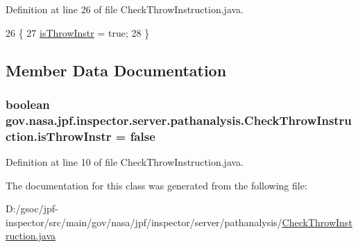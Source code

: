 Definition at line 26 of file Check\+Throw\+Instruction.\+java.


\begin{DoxyCode}
26                                 \{
27     \hyperlink{classgov_1_1nasa_1_1jpf_1_1inspector_1_1server_1_1pathanalysis_1_1_check_throw_instruction_af52802d8cf48a895650333b696ab53a4}{isThrowInstr} = \textcolor{keyword}{true};
28   \}
\end{DoxyCode}


\subsection{Member Data Documentation}
\subsubsection[{\texorpdfstring{is\+Throw\+Instr}{isThrowInstr}}]{\setlength{\rightskip}{0pt plus 5cm}boolean gov.\+nasa.\+jpf.\+inspector.\+server.\+pathanalysis.\+Check\+Throw\+Instruction.\+is\+Throw\+Instr = false\hspace{0.3cm}{\ttfamily [private]}}\hypertarget{classgov_1_1nasa_1_1jpf_1_1inspector_1_1server_1_1pathanalysis_1_1_check_throw_instruction_af52802d8cf48a895650333b696ab53a4}{}\label{classgov_1_1nasa_1_1jpf_1_1inspector_1_1server_1_1pathanalysis_1_1_check_throw_instruction_af52802d8cf48a895650333b696ab53a4}


Definition at line 10 of file Check\+Throw\+Instruction.\+java.



The documentation for this class was generated from the following file\+:\begin{DoxyCompactItemize}
\item 
D\+:/gsoc/jpf-\/inspector/src/main/gov/nasa/jpf/inspector/server/pathanalysis/\hyperlink{_check_throw_instruction_8java}{Check\+Throw\+Instruction.\+java}\end{DoxyCompactItemize}
